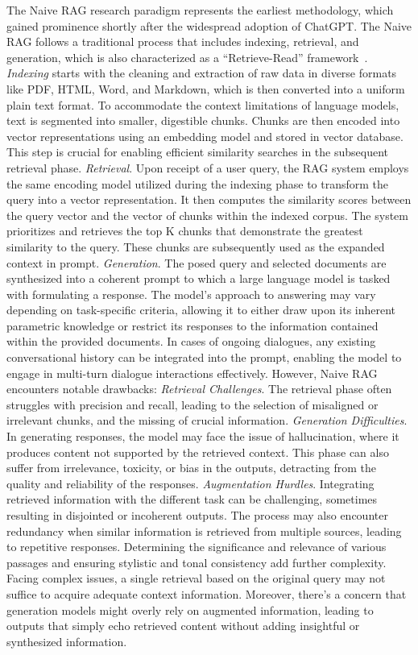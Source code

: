 The Naive RAG research paradigm represents the earliest methodology, which gained prominence shortly after the widespread adoption of ChatGPT. The Naive RAG follows a traditional process that includes indexing, retrieval, and generation, which is also characterized as a ``Retrieve-Read'' framework~.
\emph{Indexing} starts with the cleaning and extraction of raw data in diverse formats like PDF, HTML, Word, and Markdown, which is  then converted into a uniform plain text format. To accommodate the context limitations of language models,  text is segmented into smaller, digestible chunks. Chunks are then encoded into vector representations using an embedding model and stored in vector database. This step is crucial for enabling efficient similarity searches in the subsequent retrieval phase.
\emph{Retrieval}. Upon receipt of a user query,  the RAG system employs the same encoding model utilized during the indexing phase to transform the query into a vector representation. It then computes the similarity scores between the query vector and the vector of  chunks within the indexed corpus. The system prioritizes and retrieves the top K chunks that demonstrate the greatest similarity to the query. These chunks are subsequently used as the expanded context in prompt.
\emph{Generation}. The posed query and selected documents are synthesized into a coherent prompt to which a large  language model is tasked with formulating a response. The model's approach to answering may vary depending on task-specific criteria, allowing it to either draw upon its inherent parametric knowledge or restrict its responses to the information contained within the provided documents. In cases of ongoing dialogues, any existing conversational history can be integrated into the prompt, enabling the model to engage in multi-turn dialogue interactions effectively.
However, Naive RAG encounters notable drawbacks:
\emph{Retrieval Challenges}. The retrieval phase often struggles with precision and recall, leading to the selection of misaligned or irrelevant chunks, and the missing of crucial information.
\emph{Generation Difficulties}. In generating responses, the model may face the issue of hallucination, where it produces content not supported by the retrieved context. This phase can also suffer from irrelevance, toxicity, or bias in the outputs, detracting from the quality and reliability of the responses.
\emph{Augmentation Hurdles}. Integrating retrieved information with the different task can be challenging, sometimes resulting in disjointed or incoherent outputs. The process may also encounter redundancy when similar information is retrieved from multiple sources, leading to repetitive responses. Determining the significance and relevance of various passages and ensuring stylistic and tonal consistency add further complexity. Facing complex issues, a single retrieval based on the original query may not suffice to acquire adequate context information.
Moreover, there's a concern that generation models might overly rely on augmented information, leading to outputs that simply echo retrieved content without adding insightful or synthesized information.

